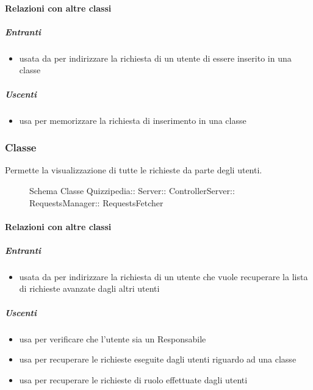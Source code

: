 \paragraph{Relazioni con altre classi}
\subparagraph{Entranti}
\begin{itemize}
\item usata da  per indirizzare la richiesta di un utente di essere inserito in una classe
\end{itemize}
\subparagraph{Uscenti}
\begin{itemize}
\item usa  per memorizzare la richiesta di inserimento in una classe
\end{itemize}
\subsubsection{Classe }
Permette la visualizzazione di tutte le richieste da parte degli utenti.
\begin{figure}[H]
\centering
\noindent{}
\caption[Schema Classe RequestsFetcher]{Schema Classe Quizzipedia:: Server:: ControllerServer:: RequestsManager:: RequestsFetcher}
\end{figure}
\paragraph{Relazioni con altre classi}
\subparagraph{Entranti}
\begin{itemize}
\item usata da  per indirizzare la richiesta di un utente che vuole recuperare la lista di richieste avanzate dagli altri utenti
\end{itemize}
\subparagraph{Uscenti}
\begin{itemize}
\item usa  per verificare che l'utente sia un Responsabile
\item usa  per recuperare le richieste eseguite dagli utenti riguardo ad una classe
\item usa  per recuperare le richieste di ruolo effettuate dagli utenti
\end{itemize}
